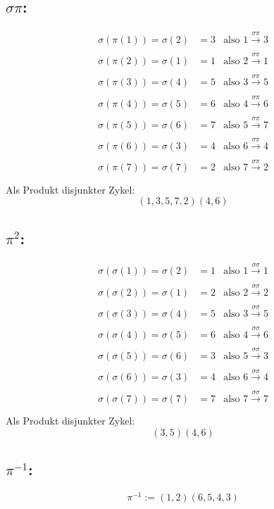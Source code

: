 \documentclass{article} %
\begin{document}
\subsection*{$\sigma \pi$:}
 \begin{align*}
        \sigma (\pi (1)) = \sigma (2) &  =3 & \text{also } 1 \xrightarrow[]{\sigma \pi} 3 \\
        \sigma (\pi (2)) = \sigma (1) &  =1 & \text{also } 2 \xrightarrow[]{\sigma \pi} 1 \\
        \sigma (\pi (3)) = \sigma (4) &  =5 & \text{also } 3 \xrightarrow[]{\sigma \pi} 5 \\
        \sigma (\pi (4)) = \sigma (5) &  =6 & \text{also } 4 \xrightarrow[]{\sigma \pi} 6 \\
        \sigma (\pi (5)) = \sigma (6) &  =7 & \text{also } 5 \xrightarrow[]{\sigma \pi} 7 \\
        \sigma (\pi (6)) = \sigma (3) &  =4 & \text{also } 6 \xrightarrow[]{\sigma \pi} 4 \\
        \sigma (\pi (7)) = \sigma (7) &  =2 & \text{also } 7 \xrightarrow[]{\sigma \pi} 2 \\
    \end{align*}
Als Produkt disjunkter Zykel: 
\[
(1,3,5,7,2)(4,6)
\]
\subsection*{$\pi^2$:}
\begin{align*}
     \sigma (\sigma (1)) = \sigma (2) &  =1 & \text{also } 1 \xrightarrow[]{\sigma \sigma} 1 \\
     \sigma (\sigma (2)) = \sigma (1) &  =2 & \text{also } 2 \xrightarrow[]{\sigma \sigma} 2 \\
     \sigma (\sigma (3)) = \sigma (4) &  =5 & \text{also } 3 \xrightarrow[]{\sigma \sigma} 5 \\
     \sigma (\sigma (4)) = \sigma (5) &  =6 & \text{also } 4 \xrightarrow[]{\sigma \sigma} 6 \\
     \sigma (\sigma (5)) = \sigma (6) &  =3 & \text{also } 5 \xrightarrow[]{\sigma \sigma} 3 \\
     \sigma (\sigma (6)) = \sigma (3) &  =4 & \text{also } 6 \xrightarrow[]{\sigma \sigma} 4   \\
     \sigma (\sigma (7)) = \sigma (7) &  = 7 & \text{also } 7 \xrightarrow[]{\sigma \sigma} 7 \\
\end{align*}
Als Produkt disjunkter Zykel: 
\[
(3,5)(4,6)
\]
\subsection*{$\pi^{-1}$:}
 \[
    \pi^{-1} := (1, 2)(6,5,4,3) 
    \]
\end{document}
